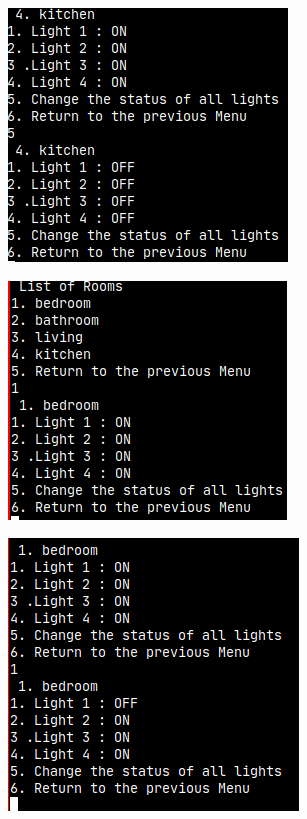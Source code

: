 \documentclass[11pt]{article}
\begin{document}
	\begin{figure}[H]
		\centering
		\includegraphics[scale=0.7]{testing_changestatus_allights}
		\caption[Testing change status of all lights]{}
		\label{fig:testingchangestatusallights}
	\end{figure}
	\begin{figure}[H]
		\centering
		\includegraphics[scale=0.7]{testing_change_status_lights}
		\caption[Testing change status of a single light]{}
		\label{fig:testingchangestatuslights}
	\end{figure}
	\begin{figure}[H]
		\centering
		\includegraphics[scale=0.7]{"testing_changestatus_single light"}
		\caption[Testing change status of a single light]{}
		\label{fig:testingchangestatussingle-light}
	\end{figure}
\end{document}
